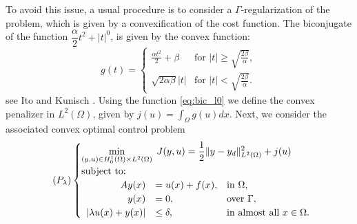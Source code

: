 \documentclass[11pt,a4paper]{amsart}
\newcommand{\om}{\Omega}
\newcommand{\norm}[1]{\lVert #1 \rVert}
\begin{document}
To avoid this issue, a usual procedure is to consider a $\Gamma$-regularization of the problem, which is given by a convexification of the cost function. The biconjugate of the function $\dfrac{\alpha}{2} t^2 + |t|^0$,  is given by the convex function:
\begin{equation} \label{eq:bic_l0}
  g(t) = 
\begin{cases} 
    \frac{\alpha t^2}{2} + \beta & \text{for } |t| \geq \sqrt{\frac{2\beta}{\alpha}}, \\
    \sqrt{2\alpha \beta} |t| & \text{for } |t| < \sqrt{\frac{2\beta}{\alpha}}.
\end{cases} 
\end{equation}
see Ito and Kunisch \cite[Remark 2.10]{itokun08}.
Using the function \eqref{eq:bic_l0} we define the convex penalizer in $L^2(\om)$, given by $j(u)=\int_\om g(u) dx$. Next, we consider the associated convex optimal control problem
\begin{equation}\label{eq:P_convex_lambda}\tag{$P_{\lambda}$}
    \begin{cases}
    \displaystyle\min_{(y,u)\in H_0^1(\om)\times L^2(\om)}\; J(y,u)=\frac{1}{2}\norm{y-y_d}^2_{L^2(\om)}+j(u)\\
    \mbox{subject to:}\\
    \begin{array}{rll}
     Ay(x)&=u(x) + f(x), &\mbox{in } \om,\\
        y(x)&=0,  &\mbox{over } \Gamma,\\    
         |\lambda u(x)+y(x)|&\leq \delta, &\mbox{in almost all }x\in \Omega.
     \end{array}
    \end{cases}
\end{equation}
\end{document}
